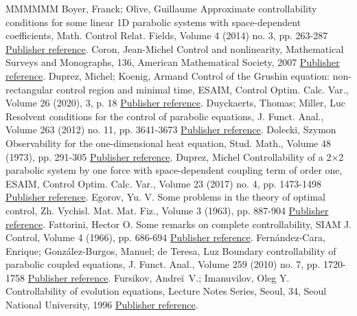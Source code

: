 \begin{thebibliography}{MMMMMM}
 Boyer, Franck; Olive, Guillaume Approximate controllability conditions for some linear 1D parabolic systems with space-dependent coefficients, Math. Control Relat. Fields, Volume 4 (2014) no. 3, pp. 263-287 \href{https://ahl.centre-mersenne.org/item/AHL_2020__3__717_0/#BoyerOlive14}{Publisher reference}.
 Coron, Jean-Michel Control and nonlinearity, Mathematical Surveys and Monographs, 136, American Mathematical Society, 2007 \href{https://ahl.centre-mersenne.org/item/AHL_2020__3__717_0/#CoronBook}{Publisher reference}.
 Duprez, Michel; Koenig, Armand Control of the Grushin equation: non-rectangular control region and minimal time, ESAIM, Control Optim. Calc. Var., Volume 26 (2020), 3, p. 18 \href{https://ahl.centre-mersenne.org/item/AHL_2020__3__717_0/#DuprezKoenig}{Publisher reference}.
 Duyckaerts, Thomas; Miller, Luc Resolvent conditions for the control of parabolic equations, J. Funct. Anal., Volume 263 (2012) no. 11, pp. 3641-3673 \href{https://ahl.centre-mersenne.org/item/AHL_2020__3__717_0/#DuyckaertsMiller12}{Publisher reference}.
 Dolecki, Szymon Observability for the one-dimensional heat equation, Stud. Math., Volume 48 (1973), pp. 291-305 \href{https://ahl.centre-mersenne.org/item/AHL_2020__3__717_0/#Dolecki73}{Publisher reference}.
 Duprez, Michel Controllability of a 2×2 parabolic system by one force with space-dependent coupling term of order one, ESAIM, Control Optim. Calc. Var., Volume 23 (2017) no. 4, pp. 1473-1498 \href{https://ahl.centre-mersenne.org/item/AHL_2020__3__717_0/#Duprez_Tmin2017}{Publisher reference}.
 Egorov, Yu. V. Some problems in the theory of optimal control, Zh. Vychisl. Mat. Mat. Fiz., Volume 3 (1963), pp. 887-904 \href{https://ahl.centre-mersenne.org/item/AHL_2020__3__717_0/#Egorov63}{Publisher reference}.
 Fattorini, Hector O. Some remarks on complete controllability, SIAM J. Control, Volume 4 (1966), pp. 686-694 \href{https://ahl.centre-mersenne.org/item/AHL_2020__3__717_0/#Fattorini66}{Publisher reference}.
 Fernández-Cara, Enrique; González-Burgos, Manuel; de Teresa, Luz Boundary controllability of parabolic coupled equations, J. Funct. Anal., Volume 259 (2010) no. 7, pp. 1720-1758 \href{https://ahl.centre-mersenne.org/item/AHL_2020__3__717_0/#FCGBdT:2010}{Publisher reference}.
 Fursikov, Andreĭ V.; Imanuvilov, Oleg Y. Controllability of evolution equations, Lecture Notes Series, Seoul, 34, Seoul National University, 1996 \href{https://ahl.centre-mersenne.org/item/AHL_2020__3__717_0/#FursikovImanuvilov96}{Publisher reference}.

\end{thebibliography}

